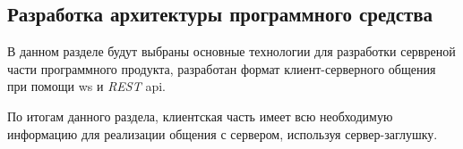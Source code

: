 \subsection{Разработка архитектуры программного средства}
\label{sec:development:arch:pp}

В данном разделе будут выбраны основные технологии для разработки сервреной части программного продукта, разработан формат клиент-серверного общения при помощи \gls{ws} и \textit{REST} \gls{api}.






По итогам данного раздела, клиентская часть имеет всю необходимую информацию для реализации общения с сервером, используя сервер-заглушку.